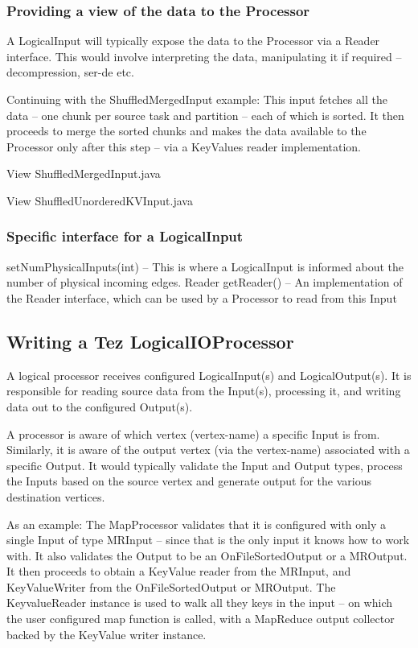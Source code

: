 \documentclass[twocolumn]{article}
\begin{document}
\subsubsection{Providing a view of the data to the Processor}

A LogicalInput will typically expose the data to the Processor via a
Reader interface. This would involve interpreting the data, manipulating
it if required -- decompression, ser-de etc.

Continuing with the ShuffledMergedInput example: This input fetches all
the data -- one chunk per source task and partition -- each of which is
sorted. It then proceeds to merge the sorted chunks and makes the data
available to the Processor only after this step -- via a KeyValues
reader implementation.

View ShuffledMergedInput.java

View ShuffledUnorderedKVInput.java

\subsubsection{Specific interface for a LogicalInput}

setNumPhysicalInputs(int) -- This is where a LogicalInput is informed
about the number of physical incoming edges. Reader getReader() -- An
implementation of the Reader interface, which can be used by a Processor
to read from this Input

\subsection{Writing a Tez LogicalIOProcessor}

A logical processor receives configured LogicalInput(s) and
LogicalOutput(s). It is responsible for reading source data from the
Input(s), processing it, and writing data out to the configured
Output(s).

A processor is aware of which vertex (vertex-name) a specific Input is
from. Similarly, it is aware of the output vertex (via the vertex-name)
associated with a specific Output. It would typically validate the Input
and Output types, process the Inputs based on the source vertex and
generate output for the various destination vertices.

As an example: The MapProcessor validates that it is configured with
only a single Input of type MRInput -- since that is the only input it
knows how to work with. It also validates the Output to be an
OnFileSortedOutput or a MROutput. It then proceeds to obtain a KeyValue
reader from the MRInput, and KeyValueWriter from the OnFileSortedOutput
or MROutput. The KeyvalueReader instance is used to walk all they keys
in the input -- on which the user configured map function is called,
with a MapReduce output collector backed by the KeyValue writer
instance.
\end{document}
